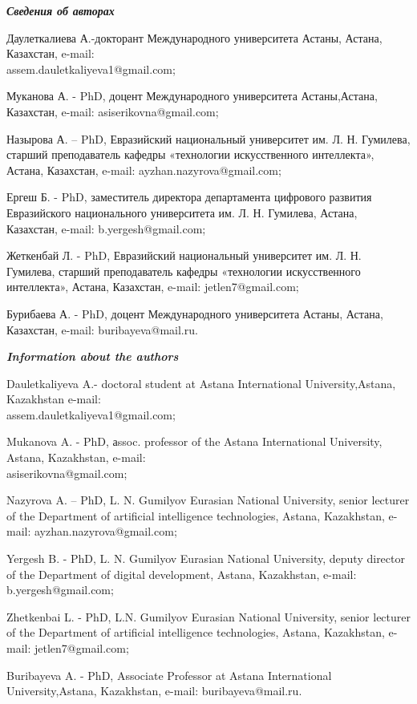 \begin{authorinfo}
\hspace{1em}\emph{{\bfseries Сведения об авторах}}

Даулеткалиева А.-докторант Международного университета Астаны, Астана,
Казахстан, e-mail:\\ assem.dauletkaliyeva1@gmail.com;

Муканова А. - PhD, доцент Международного университета Астаны,Астана,
Казахстан, e-mail: asiserikovna@gmail.com;

Назырова А. -- PhD, Евразийский национальный университет им. Л. Н.
Гумилева, старший преподаватель кафедры «технологии искусственного
интеллекта», Астана, Казахстан, e-mail: ayzhan.nazyrova@gmail.com;

Ергеш Б. - PhD, заместитель директора департамента цифрового развития
Евразийского национального университета им. Л. Н. Гумилева, Астана,
Казахстан, e-mail: b.yergesh@gmail.com;

Жеткенбай Л. - PhD, Евразийский национальный университет им. Л. Н.
Гумилева, старший преподаватель кафедры «технологии искусственного
интеллекта», Астана, Казахстан, e-mail: jetlen7@gmail.com;

Бурибаева А. - PhD, доцент Международного университета Астаны, Астана,
Казахстан, e-mail: buribayeva@mail.ru.

\hspace{1em}\emph{{\bfseries Information about the authors}}

Dauletkaliyeva A.- doctoral student at Astana International
University,Astana, Kazakhstan e-mail:\\
assem.dauletkaliyeva1@gmail.com;

Mukanova A. - PhD, аssoc. professor of the Astana International
University, Astana, Kazakhstan, e-mail: \\asiserikovna@gmail.com;

Nazyrova A. -- PhD, L. N. Gumilyov Eurasian National University, senior
lecturer of the Department of artificial intelligence technologies,
Astana, Kazakhstan, e-mail: ayzhan.nazyrova@gmail.com;

Yergesh B. - PhD, L. N. Gumilyov Eurasian National University, deputy
director of the Department of digital development, Astana, Kazakhstan,
e-mail: b.yergesh@gmail.com;

Zhetkenbai L. - PhD, L.N. Gumilyov Eurasian National University, senior
lecturer of the Department of artificial intelligence technologies,
Astana, Kazakhstan, e-mail: jetlen7@gmail.com;

Buribayeva A. - PhD, Associate Professor at Astana International
University,Astana, Kazakhstan, e-mail: buribayeva@mail.ru.
\end{authorinfo}
